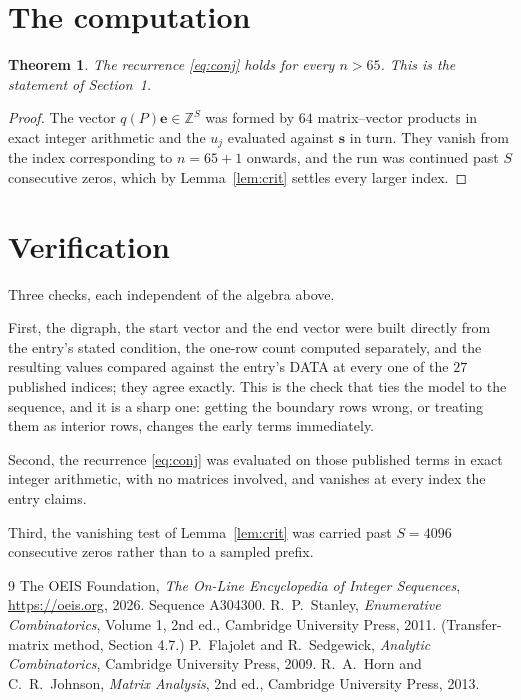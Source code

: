 \documentclass[11pt,a4paper]{article}
\theoremstyle{plain}
\newtheorem{theorem}{Theorem}
\theoremstyle{definition}
\begin{document}
\section{The computation}

\begin{theorem}
The recurrence \eqref{eq:conj} holds for every $n>65$. This is the statement of
Section~1.
\end{theorem}

\begin{proof}
The vector $q(P)\mathbf{e}\in\mathbb{Z}^{S}$ was formed by $64$ matrix--vector
products in exact integer arithmetic and the $u_j$ evaluated against $\mathbf{s}$ in turn.
They vanish from the index corresponding to $n=65+1$ onwards, and the run was continued
past $S$ consecutive zeros, which by Lemma~\ref{lem:crit} settles every larger index.
\end{proof}

\section{Verification}

Three checks, each independent of the algebra above.

First, the digraph, the start vector and the end vector were built directly from the
entry's stated condition, the one-row count computed separately, and the resulting values
compared against the entry's DATA at every one of the $27$ published indices; they
agree exactly. This is the check that ties the model to the sequence, and it is a sharp one:
getting the boundary rows wrong, or treating them as interior rows, changes the early terms
immediately.

Second, the recurrence \eqref{eq:conj} was evaluated on those published terms in exact
integer arithmetic, with no matrices involved, and vanishes at every index the entry claims.

Third, the vanishing test of Lemma~\ref{lem:crit} was carried past $S=4096$ consecutive
zeros rather than to a sampled prefix.

\begin{thebibliography}{9}
 The OEIS Foundation, \emph{The On-Line Encyclopedia of Integer
Sequences}, \url{https://oeis.org}, 2026. Sequence A304300.
 R.~P.~Stanley, \emph{Enumerative Combinatorics}, Volume 1, 2nd ed.,
Cambridge University Press, 2011. (Transfer-matrix method, Section 4.7.)
 P.~Flajolet and R.~Sedgewick, \emph{Analytic Combinatorics}, Cambridge
University Press, 2009.
 R.~A.~Horn and C.~R.~Johnson, \emph{Matrix Analysis}, 2nd ed., Cambridge
University Press, 2013.
\end{thebibliography}
\end{document}
